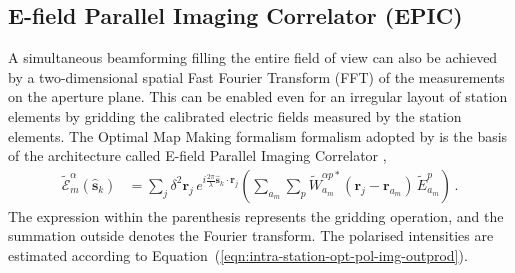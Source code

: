 \documentclass[
  journal=pasa,
  manuscript=article-type,
  year=2020,
  volume=37,
]{cup-journal}
\begin{document}
\subsection{E-field Parallel Imaging Correlator (EPIC)}

A simultaneous beamforming filling the entire field of view can also be achieved by a two-dimensional spatial Fast Fourier Transform (FFT) of the measurements on the aperture plane. This can be enabled even for an irregular layout of station elements by gridding the calibrated electric fields measured by the station elements. The Optimal Map Making formalism \citep[OMM;][]{Tegmark1997a} formalism adopted by \citet{Morales2011} is the basis of the architecture called E-field Parallel Imaging Correlator \cite[EPIC;][]{Thyagarajan+2017},
\begin{align}
    \widetilde{\mathcal{E}}_m^\alpha(\hat{\boldsymbol{s}}_k) &= \sum_j \delta^2 \boldsymbol{r}_j \, e^{i\frac{2\pi}{\lambda} \hat{\boldsymbol{s}}_k\cdot\boldsymbol{r}_j} \left(\sum_{a_m} \sum_p \widetilde{W}_{a_m}^{\alpha p*}(\boldsymbol{r}_j-\boldsymbol{r}_{a_m}) \, \widetilde{E}_{a_m}^p \right) \, . \label{eqn:intra-station-pol-hol-img-epic}
\end{align}
The expression within the parenthesis represents the gridding operation, and the summation outside denotes the Fourier transform. The polarised intensities are estimated according to Equation~(\ref{eqn:intra-station-opt-pol-img-outprod}).
\end{document}
